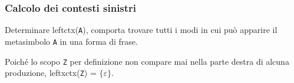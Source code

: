 \subsubsection{Calcolo dei contesti sinistri}
Determinare leftctx(\texttt{A}), comporta trovare tutti i modi in cui può apparire il metasimbolo \texttt{A} in una forma di frase.

Poiché lo scopo \texttt{Z} per definizione non compare mai nella parte destra di alcuna produzione, leftxctx(\texttt{Z}) = $\{ \varepsilon \}$.










































































